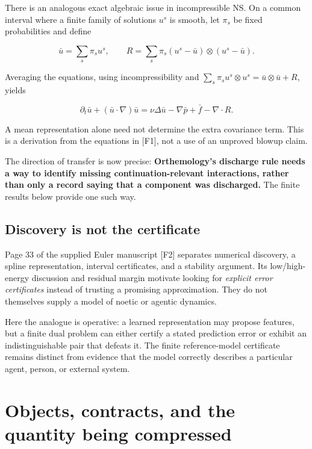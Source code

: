 \documentclass[11pt,a4paper]{article}
\begin{document}
There is an analogous exact algebraic issue in incompressible NS. On a
common interval where a finite family of solutions \(u^s\) is smooth,
let \(\pi_s\) be fixed probabilities and define

\nopagebreak[4]

\[
\bar u=\sum_s\pi_su^s,\qquad
R=\sum_s\pi_s(u^s-\bar u)\otimes(u^s-\bar u).
\]

Averaging the equations, using incompressibility and
\(\sum_s\pi_su^s\otimes u^s=\bar u\otimes\bar u+R\), yields

\nopagebreak[4]

\[
\partial_t\bar u+(\bar u\cdot\nabla)\bar u
 =\nu\Delta\bar u-\nabla\bar p+\bar f-\nabla\cdot R.
\]

A mean representation alone need not determine the extra covariance
term. This is a derivation from the equations in {[}F1{]}, not a use of
an unproved blowup claim.

The direction of transfer is now precise: \textbf{Orthemology's
discharge rule needs a way to identify missing continuation-relevant
interactions, rather than only a record saying that a component was
discharged.} The finite results below provide one such way.

\subsection{Discovery is not the
certificate}\label{discovery-is-not-the-certificate}

Page 33 of the supplied Euler manuscript {[}F2{]} separates numerical
discovery, a spline representation, interval certificates, and a
stability argument. Its low/high-energy discussion and residual margin
motivate looking for \emph{explicit error certificates} instead of
trusting a promising approximation. They do not themselves supply a
model of noetic or agentic dynamics.

Here the analogue is operative: a learned representation may propose
features, but a finite dual problem can either certify a stated
prediction error or exhibit an indistinguishable pair that defeats it.
The finite reference-model certificate remains distinct from evidence
that the model correctly describes a particular agent, person, or
external system.

\section{Objects, contracts, and the quantity being
compressed}\label{objects-contracts-and-the-quantity-being-compressed}
\end{document}
